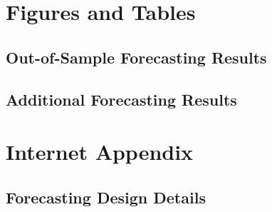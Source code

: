 \documentclass[preprint,12pt,authoryear]{elsarticle}
\begin{document}



\pagebreak
\begin{appendices}
\label{appendices}

\section{Figures and Tables}
\suppressfloats[t]














\clearpage

\subsection{Out-of-Sample Forecasting Results}



\clearpage

\subsection{Additional Forecasting Results}



\clearpage

\section{Internet Appendix}

\setcounter{table}{0}
\renewcommand{\thetable}{IA.\arabic{table}}
\renewcommand{\theHtable}{IA.\arabic{table}}
\setcounter{figure}{0}
\renewcommand{\thefigure}{IA.\arabic{figure}}
\renewcommand{\theHfigure}{IA.\arabic{figure}}
\setcounter{equation}{0}
\renewcommand{\theequation}{IA.\arabic{equation}}
\renewcommand{\theHequation}{IA.\arabic{equation}}


\subsection{Forecasting Design Details}\label{app:algorithmic}


\end{appendices}
\end{document}
